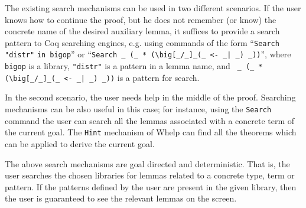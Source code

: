 The existing search mechanisms can be used in two different scenarios. If the user knows how to continue the proof, but
he does not remember (or know) the concrete name of the desired auxiliary lemma, it suffices to provide a search pattern to Coq searching engines, e.g.
using commands of the form
``\lstinline?Search "distr"? \lstinline?in bigop?'' or   
``\lstinline?Search _ (_ * (\big[_/_]_(_ <- _| _) _))?'',
 where \texttt{bigop} is a library, \texttt{"distr"} is a pattern in a lemma name, and  \lstinline? _ (_ * (\big[_/_]_(_ <- _| _) _))?
is a pattern for search.
 
In the second scenario, the user needs help in the middle of the proof. Searching mechanisms can be also useful in this 
case; for instance, using the \lstinline?Search? command the user can search all the lemmas associated with a concrete term
of the current goal. The \lstinline?Hint? mechanism of Whelp can find all the theorems which can be applied to derive the current goal.



The above search mechanisms are goal directed and deterministic. That is, the user
searches  the chosen  libraries for lemmas related to a concrete type, term or pattern. 
If the patterns defined by the user are present in the given library, then the user is guaranteed to see the relevant lemmas on the screen.

